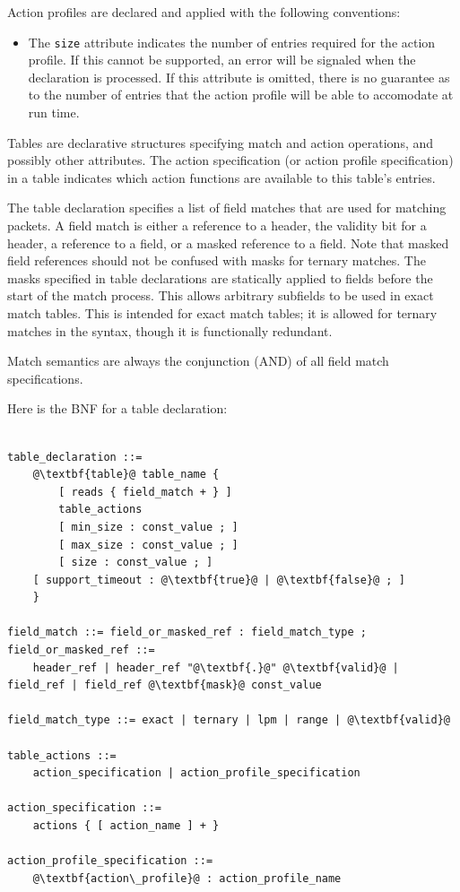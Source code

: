 \documentclass[12pt]{article}
\begin{document}
Action profiles are declared and applied with the following conventions:

\begin{itemize}
\item
The \texttt{size} attribute indicates the number of entries required for the
action profile. If this cannot be supported, an error will be signaled when the
declaration is processed. If this attribute is omitted, there is no guarantee as
to the number of entries that the action profile will be able to accomodate at
run time.
\end{itemize}



Tables are declarative structures specifying match and action operations, and
possibly other attributes. The action specification (or action profile
specification) in a table indicates which action functions are available to this
table's entries.

The table declaration specifies a list of field matches that are used
for matching packets. A field match is either a reference to a header,
the validity bit for a header, a reference to a field, or a masked
reference to a field. Note that masked field references should not be
confused with masks for ternary matches. The masks specified in table
declarations are statically applied to fields before the start of the
match process. This allows arbitrary subfields to be used in exact
match tables. This is intended for exact match tables; it is allowed
for ternary matches in the syntax, though it is functionally
redundant.

Match semantics are always the conjunction (AND) of all field match
specifications.

Here is the BNF for a table declaration:

\begin{lstlisting}[frame=single,backgroundcolor=\color{bnfgreen},escapechar=\@]

table_declaration ::=
    @\textbf{table}@ table_name {
        [ reads { field_match + } ]
        table_actions
        [ min_size : const_value ; ]
        [ max_size : const_value ; ]
        [ size : const_value ; ]
	[ support_timeout : @\textbf{true}@ | @\textbf{false}@ ; ]
    }

field_match ::= field_or_masked_ref : field_match_type ;
field_or_masked_ref ::= 
    header_ref | header_ref "@\textbf{.}@" @\textbf{valid}@ | field_ref | field_ref @\textbf{mask}@ const_value

field_match_type ::= exact | ternary | lpm | range | @\textbf{valid}@

table_actions ::= 
    action_specification | action_profile_specification

action_specification ::= 
    actions { [ action_name ] + }

action_profile_specification ::= 
    @\textbf{action\_profile}@ : action_profile_name

\end{lstlisting}
\end{document}
